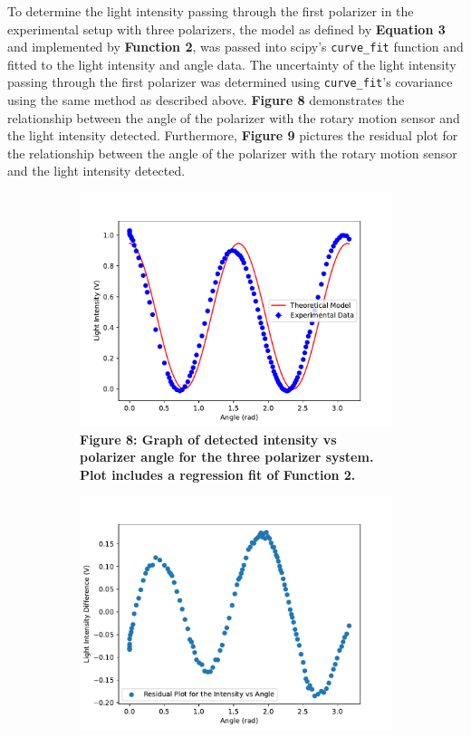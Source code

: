 \documentclass[
	letterpaper, %
	10pt, %
]{CSUniSchoolLabReport}
\begin{document}
To determine the light intensity passing through the first polarizer in the experimental setup with
three polarizers, the model as defined by \textbf{Equation 3} and implemented by \textbf{Function 2}, was passed into
scipy's \lstinline{curve_fit} function and fitted to the light intensity and angle data. The uncertainty of the
light intensity passing through the first polarizer was determined using \lstinline{curve_fit}'s
covariance using the same method as described above. \textbf{Figure 8} demonstrates the relationship between
the angle of the polarizer with the rotary motion sensor and the light intensity detected. Furthermore,
\textbf{Figure 9} pictures the residual plot for the relationship between the angle of the polarizer with the rotary
motion sensor and the light intensity detected.\\
\begin{figure}[H]
	\begin{subfigure}[t]{0.45\textwidth}
		\centering
		\includegraphics[width=\textwidth]{../figures/figure8.pdf}
		\caption{\textbf{Figure 8: Graph of detected intensity vs polarizer angle for the three polarizer system. Plot includes a regression fit of Function 2. }}
	\end{subfigure}
	\hfill
	\begin{subfigure}[t]{0.45\textwidth}
		\includegraphics[width=\textwidth]{../figures/figure9.pdf}

\end{subfigure}
\end{figure}
\end{document}
